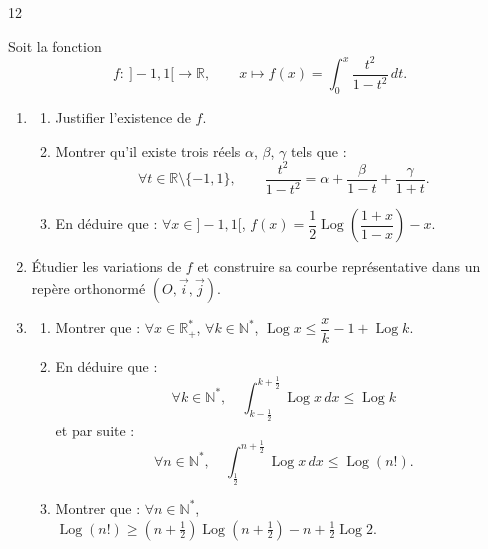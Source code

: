 \documentclass{axiobac}
\begin{document}
\begin{probleme}{12}


Soit la fonction
\[
f : \ ]-1, 1[ \longrightarrow \mathbb{R}, \qquad x \longmapsto f(x) = \int_0^x \frac{t^2}{1 - t^2}\,dt .
\]

\begin{enumerate}
    \item
    \begin{enumerate}
        \item Justifier l'existence de $f$.
        \item Montrer qu'il existe trois réels $\alpha$, $\beta$, $\gamma$ tels que :
        \[
        \forall t \in \mathbb{R} \setminus \{-1, 1\}, \qquad \frac{t^2}{1 - t^2} = \alpha + \frac{\beta}{1 - t} + \frac{\gamma}{1 + t} .
        \]
        \item En déduire que : $\forall x \in ]-1, 1[$, $f(x) = \dfrac{1}{2} \operatorname{Log}\left(\dfrac{1 + x}{1 - x}\right) - x$.
    \end{enumerate}
    \item Étudier les variations de $f$ et construire sa courbe représentative dans un repère orthonormé $(O, \vec{i}, \vec{j})$.
    \item
    \begin{enumerate}
        \item Montrer que : $\forall x \in \mathbb{R}^*_+$, $\forall k \in \mathbb{N}^*$, $\operatorname{Log} x \leqslant \dfrac{x}{k} - 1 + \operatorname{Log} k$.
        \item En déduire que :
        \[
        \forall k \in \mathbb{N}^*, \quad \int_{k - \frac12}^{k + \frac12} \operatorname{Log} x\,dx \leqslant \operatorname{Log} k
        \]
        et par suite :
        \[
        \forall n \in \mathbb{N}^*, \quad \int_{\frac12}^{n + \frac12} \operatorname{Log} x\,dx \leqslant \operatorname{Log}(n!) .
        \]
        \item Montrer que : $\forall n \in \mathbb{N}^*$, $\operatorname{Log}(n!) \geqslant \left(n + \frac12\right) \operatorname{Log}\left(n + \frac12\right) - n + \frac12 \operatorname{Log} 2$.
    \end{enumerate}

\end{enumerate}
\end{probleme}
\end{document}
